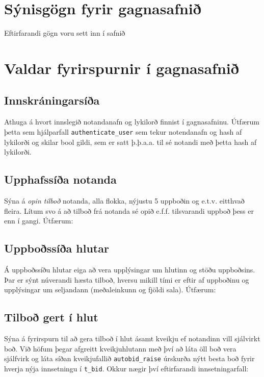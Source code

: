 \documentclass[a4paper,icelandic]{article}
\theoremstyle{definition} \newtheorem{skilgr}{Skilgreining}
\theoremstyle{plain}      \newtheorem{setn}{Setning}
\theoremstyle{remark}     \newtheorem*{lausn}{Lausn}
\begin{document}
\section{Sýnisgögn fyrir gagnasafnið}

Eftirfarandi gögn voru sett inn í safnið


\section{Valdar fyrirspurnir í gagnasafnið}

\subsection{Innskráningarsíða}

Athuga á hvort innslegið notandanafn og lykilorð finnist í gagnasafninu. Útfærum
þetta sem hjálparfall \verb|authenticate_user| sem tekur notendanafn og hash af
lykilorði og skilar bool gildi, sem er satt þ.þ.a.a. til sé notandi með þetta
hash af lykilorði.


\subsection{Upphafssíða notanda}

Sýna á \emph{opin tilboð} notanda, alla flokka, nýjustu 5 uppboðin og e.t.v.
eitthvað fleira. Lítum svo á að tilboð frá notanda sé opið e.f.f. tilsvarandi
uppboð þess er enn í gangi. Útfærum:


\subsection{Uppboðssíða hlutar}
Á uppboðssíðu hlutar eiga að vera upplýsingar um hlutinn og stöðu uppboðsins.
Þar er sýnt núverandi hæsta tilboð, hversu mikill tími er eftir af uppboðinu og
upplýsingar um seljandann (meðaleinkunn og fjöldi sala). Útfærum:


\subsection{Tilboð gert í hlut}

Sýna á fyrirspurn til að gera tilboð í hlut ásamt kveikju ef notandinn vill
sjálvirkt boð. Við höfum þegar afgreitt kveikjuhlutann með því að láta öll boð
vera sjálfvirk og láta síðan kveikjufallið \verb|autobid_raise| úrskurða nýtt
besta boð fyrir hverja nýja innsetningu í \verb|t_bid|. Okkur nægir því
eftirfarandi innsetningarfall:

\end{document}
